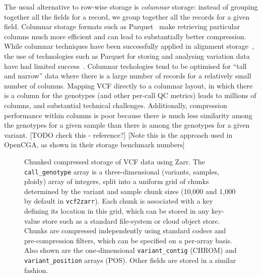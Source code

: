 \documentclass[a4paper,num-refs]{oup-contemporary}
\begin{document}
The usual alternative to row-wise storage is \emph{columnar} storage:
instead of grouping together all the fields for a record,
we group together all the records for a given field.
Columnar storage formats such as Parquet~\citep{parquet2024}
make retrieving particular columns much 
more efficient and can lead to substantially better compression.
While columnar techniques have been successfully applied 
in alignment
storage~\citep[e.g.][]{bonfield2014scramble,nothaft2015rethinking,bonfield2022cram},
the use of technologies such as Parquet for 
storing and analysing variation data have had limited
success~\citep{boufea2017managing,fan2020variant}.
Columnar techologies tend to be 
optimised for ``tall and narrow'' data where there is a large number of records
for a relatively small number of columns. 
Mapping VCF directly to a columnar layout, in which there is a 
column for the genotypes (and other per-call QC metrics) 
leads to millions of columns, and substantial technical challenges.
Additionally, compression performance within columns is poor 
because there is much less similarity among
the genotypes for a given sample than there is among the genotypes
for a given variant. [TODO check this - reference?]
[Note this is the approach used in OpenCGA, as shown in their storage 
benchmark numbers]

\begin{figure}
\resizebox{225pt}{!}{}
\caption{Chunked compressed storage of VCF data using Zarr. 
The \texttt{call\_genotype} array is a three-dimensional (variants, samples,
ploidy) array of integers, split into a uniform grid of 
chunks determined by the variant and sample chunk sizes (10,000
and 1,000 by default in \texttt{vcf2zarr}). Each chunk is associated 
with a key defining its location in this grid, which can be stored 
in any key-value store such as a standard file-system or cloud object
store. Chunks are compressed independently using standard 
codecs and pre-compression filters, which can be specified on a per-array
basis. Also shown are the one-dimensional \texttt{variant\_contig} (CHROM)
and \texttt{variant\_position} arrays (POS). Other fields are stored 
in a similar fashion. \label{fig-data-model}}
\end{figure}
\end{document}
